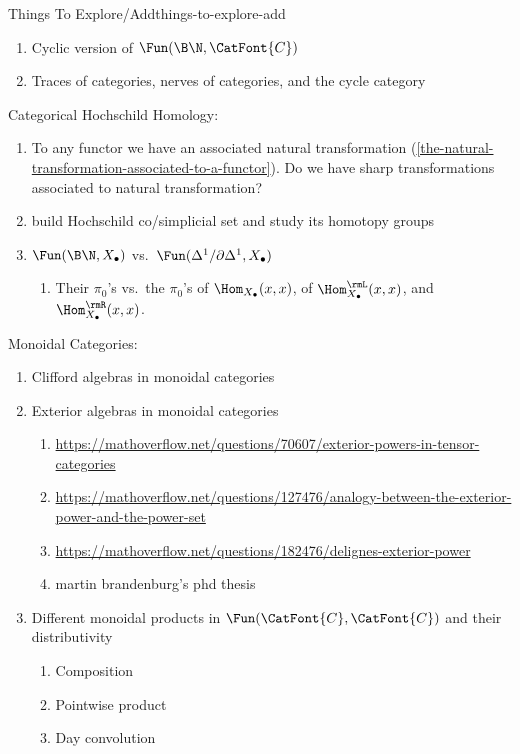 \begin{remark}{Things To Explore/Add}{things-to-explore-add}
\begin{enumerate}
        \item Cyclic version of $\Fun(\B\N,\CatFont{C})$
        \item Traces of categories, nerves of categories, and the cycle category
    \end{enumerate}
    Categorical Hochschild Homology:
    \begin{enumerate}
        \item To any functor we have an associated natural transformation (\cref{the-natural-transformation-associated-to-a-functor}). Do we have sharp transformations associated to natural transformation?
        \item build Hochschild co/simplicial set and study its homotopy groups
        \item $\Fun(\B\N,X_{\bullet})$ vs.\ $\Fun(\Delta^{1}/\partial\Delta^{1},X_{\bullet})$
            \begin{enumerate}
                \item Their $\pi_{0}$'s vs.\ the $\pi_{0}$'s of $\Hom_{X_{\bullet}}(x,x)$, of $\Hom^{\rmL}_{X_{\bullet}}(x,x)$, and $\Hom^{\rmR}_{X_{\bullet}}(x,x)$.
            \end{enumerate}
    \end{enumerate}
    Monoidal Categories:
    \begin{enumerate}
        \item Clifford algebras in monoidal categories
        \item Exterior algebras in monoidal categories
            \begin{enumerate}
                \item \url{https://mathoverflow.net/questions/70607/exterior-powers-in-tensor-categories}
                \item \url{https://mathoverflow.net/questions/127476/analogy-between-the-exterior-power-and-the-power-set}
                \item \url{https://mathoverflow.net/questions/182476/delignes-exterior-power}
                \item martin brandenburg's phd thesis
            \end{enumerate}
        \item Different monoidal products in $\Fun(\CatFont{C},\CatFont{C})$ and their distributivity
            \begin{enumerate}
                \item Composition
                \item Pointwise product
                \item Day convolution

\end{enumerate}
\end{enumerate}
\end{remark}
